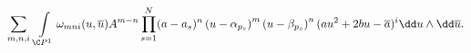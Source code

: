 \begin{equation}
\sum\limits_{m,n,i}\:\int\limits_{\C
P^1}\omega_{mni}(u, \overline{u})A^{m-n}\prod_{s=1}^N
(a-a_s)^n\left(u-\alpha_{p_s}\right)^m\left(u-\beta_{p_s}\right)^n
(au^2+2bu- \overline{a})^i\dd u\wedge\dd\overline{u}.
\label{mEHmegoldas}
\end{equation}

